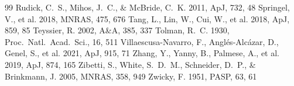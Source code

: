 \documentclass[usenatbib]{mnras}
\begin{document}
\begin{thebibliography}{99}
Rudick, C.~S., Mihos, J.~C., \& McBride, C.~K. 2011, ApJ, 732, 48
Springel, V., et al. 2018, MNRAS, 475, 676
Tang, L., Lin, W., Cui, W., et al. 2018, ApJ, 859, 85
Teyssier, R. 2002, A\&A, 385, 337
Tolman, R.~C. 1930, Proc.\ Natl.\ Acad.\ Sci., 16, 511
Villaescusa-Navarro, F., Angl\'es-Alc\'azar, D., Genel, S., et al. 2021, ApJ, 915, 71
Zhang, Y., Yanny, B., Palmese, A., et al. 2019, ApJ, 874, 165
Zibetti, S., White, S.~D.~M., Schneider, D.~P., \& Brinkmann, J. 2005, MNRAS, 358, 949
Zwicky, F. 1951, PASP, 63, 61
\end{thebibliography}

\bsp
\label{lastpage}
\end{document}
